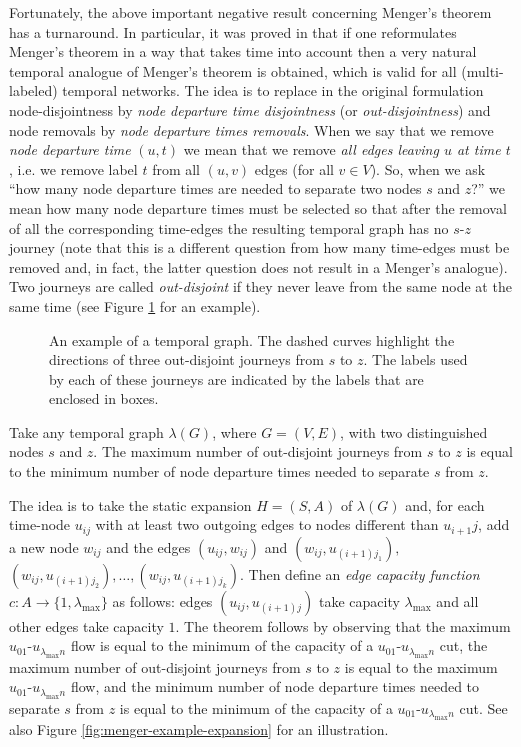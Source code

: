 \documentclass[oribibl, 11pt]{llncs}
\begin{document}
Fortunately, the above important negative result concerning Menger's theorem has a turnaround. In particular, it was proved in \cite{MMCS13} that if one reformulates Menger's theorem in a way that takes time into account then a very natural temporal analogue of Menger's theorem is obtained, which is valid for all (multi-labeled) temporal networks. The idea is to replace in the original formulation node-disjointness by \emph{node departure time disjointness} (or \emph{out-disjointness}) and node removals by \emph{node departure times removals}. When we say that we remove \emph{node departure time} $(u,t)$ we mean that we remove \emph{all edges leaving $u$ at time $t$}, i.e. we remove label $t$ from all $(u,v)$ edges (for all $v\in V$). So, when we ask ``how many node departure times are needed to separate two nodes $s$ and $z$?'' we mean how many node departure times must be selected so that after the removal of all the corresponding time-edges the resulting temporal graph has no $s$-$z$ journey (note that this is a different question from how many time-edges must be removed and, in fact, the latter question does not result in a Menger's analogue). Two journeys are called \emph{out-disjoint} if they never leave from the same node at the same time (see Figure \ref{fig:menger-example} for an example).

\begin{figure}[!hbtp]
   \caption{An example of a temporal graph. The dashed curves highlight the directions of three out-disjoint journeys from $s$ to $z$. The labels used by each of these journeys are indicated by the labels that are enclosed in boxes.} \label{fig:menger-example}
\end{figure}

\begin{theorem}  \label{the:dmeng}
Take any temporal graph $\lambda(G)$, where $G=(V,E)$, with two distinguished nodes $s$ and $z$. The maximum number of out-disjoint journeys from $s$ to $z$ is equal to the minimum number of node departure times needed to separate $s$ from $z$.  
\end{theorem}

The idea is to take the static expansion $H=(S,A)$ of $\lambda(G)$ and, for each time-node $u_{ij}$ with at least two outgoing edges to nodes different than $u_{i+1}j$, add a new node $w_{ij}$ and the edges $(u_{ij},w_{ij})$ and $(w_{ij},u_{(i+1)j_1}),$ $(w_{ij},u_{(i+1)j_2}),\ldots,(w_{ij},u_{(i+1)j_k})$. Then define an \emph{edge capacity function $c:A\rightarrow \{1,\lambda_{\max}\}$} as follows: edges $(u_{ij},u_{(i+1)j})$ take capacity $\lambda_{\max}$ and all other edges take capacity $1$. The theorem follows by observing that the maximum $u_{01}$-$u_{\lambda_{\max}n}$ flow is equal to the minimum of the capacity of a $u_{01}$-$u_{\lambda_{\max}n}$ cut, the maximum number of out-disjoint journeys from $s$ to $z$ is equal to the maximum $u_{01}$-$u_{\lambda_{\max}n}$ flow, and the minimum number of node departure times needed to separate $s$ from $z$ is equal to the minimum of the capacity of a $u_{01}$-$u_{\lambda_{\max}n}$ cut. See also Figure \ref{fig:menger-example-expansion} for an illustration.
\end{document}
